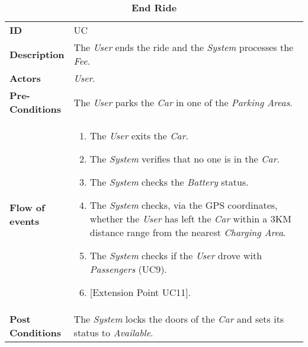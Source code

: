 \begin{longtable}{|p{0.2\linewidth} p{0.8\linewidth}|}
	\captionsetup{labelformat=empty} %
	\caption{\textbf{End Ride}} %
	\label{UC_EndRide}%
	\\ \hline %
	
	\textbf{ID} & UC\theUseCaseIdCounter \\ \hline
	\textbf{Description} & The \emph{User} ends the ride and the \emph{System} processes the \emph{Fee}. \\ \hline
	\textbf{Actors} & \emph{User}.\\ \hline
	\textbf{Pre-Conditions} & The \emph{User} parks the \emph{Car} in one of the \emph{Parking Areas}. \\ \hline
	\textbf{Flow of events} & 
	\begin{enumerate}
		\item The \emph{User} exits the \emph{Car}.
		\item The \emph{System} verifies that no one is in the \emph{Car}.
		\item The \emph{System} checks the \emph{Battery} status. 
		\item The \emph{System} checks, via the GPS coordinates, whether the \emph{User} has left the \emph{Car} within a 3KM distance range from the nearest \emph{Charging Area}.
		\item The \emph{System} checks if the \emph{User} drove with \emph{Passengers} (UC9).
		\item {[}Extension Point UC11{]}.
	\end{enumerate}	 \\ \hline
	\textbf{Post Conditions} & The \emph{System} locks the doors of the \emph{Car} and sets its status to \emph{Available}.
	

\end{longtable}
